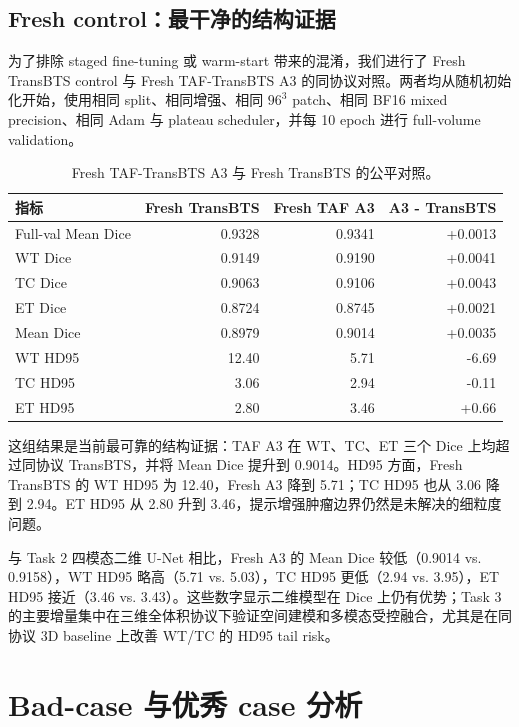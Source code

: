 \documentclass[UTF8,11pt]{ctexart}
\begin{document}
\subsection{Fresh control：最干净的结构证据}

为了排除 staged fine-tuning 或 warm-start 带来的混淆，我们进行了 Fresh TransBTS control 与 Fresh TAF-TransBTS A3 的同协议对照。两者均从随机初始化开始，使用相同 split、相同增强、相同 $96^3$ patch、相同 BF16 mixed precision、相同 Adam 与 plateau scheduler，并每 10 epoch 进行 full-volume validation。

\begin{table}[H]
\centering
\caption{Fresh TAF-TransBTS A3 与 Fresh TransBTS 的公平对照。}
\begin{tabular}{lrrr}
\toprule
指标 & Fresh TransBTS & Fresh TAF A3 & A3 - TransBTS \\
\midrule
Full-val Mean Dice & 0.9328 & 0.9341 & +0.0013 \\
WT Dice & 0.9149 & 0.9190 & +0.0041 \\
TC Dice & 0.9063 & 0.9106 & +0.0043 \\
ET Dice & 0.8724 & 0.8745 & +0.0021 \\
Mean Dice & 0.8979 & 0.9014 & +0.0035 \\
WT HD95 & 12.40 & 5.71 & -6.69 \\
TC HD95 & 3.06 & 2.94 & -0.11 \\
ET HD95 & 2.80 & 3.46 & +0.66 \\
\bottomrule
\end{tabular}
\end{table}

这组结果是当前最可靠的结构证据：TAF A3 在 WT、TC、ET 三个 Dice 上均超过同协议 TransBTS，并将 Mean Dice 提升到 0.9014。HD95 方面，Fresh TransBTS 的 WT HD95 为 12.40，Fresh A3 降到 5.71；TC HD95 也从 3.06 降到 2.94。ET HD95 从 2.80 升到 3.46，提示增强肿瘤边界仍然是未解决的细粒度问题。

与 Task 2 四模态二维 U-Net 相比，Fresh A3 的 Mean Dice 较低（0.9014 vs. 0.9158），WT HD95 略高（5.71 vs. 5.03），TC HD95 更低（2.94 vs. 3.95），ET HD95 接近（3.46 vs. 3.43）。这些数字显示二维模型在 Dice 上仍有优势；Task 3 的主要增量集中在三维全体积协议下验证空间建模和多模态受控融合，尤其是在同协议 3D baseline 上改善 WT/TC 的 HD95 tail risk。

\section{Bad-case 与优秀 case 分析}
\end{document}
